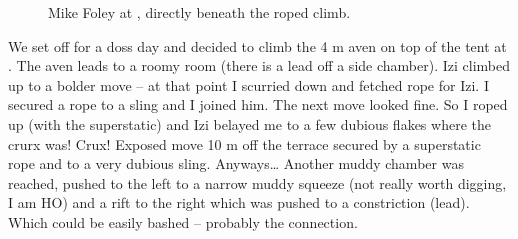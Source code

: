 \begin{figure}
\checkoddpage \ifoddpage \forcerectofloat \else \forceversofloat \fi
\centering
 \caption{Mike Foley at , directly beneath the roped  climb. }
 \label{metal aven porridge}
\end{figure}



We set off for a doss day and decided to climb the 4 m aven on top of
the tent at . The aven leads to a roomy room (there is
a lead off a side chamber). Izi climbed up to a bolder move -- at that
point I scurried down and fetched rope for Izi. I secured a rope to a
sling and I joined him. The next move looked fine. So I roped up (with
the superstatic) and Izi belayed me to a few dubious flakes where the
crurx was! Crux! Exposed move 10 m off the terrace secured by a
superstatic rope and to a very dubious sling. Anyways\ldots{} Another
muddy chamber was reached, pushed to the left to a narrow muddy squeeze
(not really worth digging, I am HO) and a rift to the right which was
pushed to a constriction (lead). Which could be easily bashed --
probably the connection.



